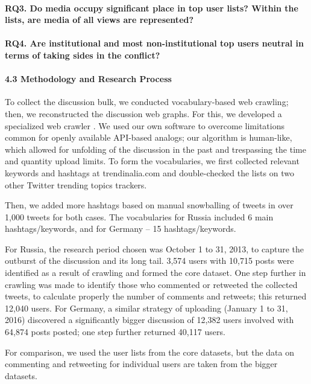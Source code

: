 \paragraph{RQ3. Do media occupy significant place in top user lists? Within the lists, are media of all views are represented?}

\paragraph{RQ4. Are institutional and most non-institutional top users neutral in terms of taking sides in the conflict?}

\paragraph{4.3 Methodology and Research Process} 

To collect the discussion bulk, we conducted vocabulary-based web crawling; then, we reconstructed the discussion web graphs. For this, we developed a specialized web crawler \cite{BlekanovSergeevMartynenko}. We used our own software to overcome limitations common for openly available API-based analogs; our algorithm is human-like, which allowed for unfolding of the discussion in the past and trespassing the time and quantity upload limits. To form the vocabularies, we first collected relevant keywords and hashtags at trendinalia.com and double-checked the lists on two other Twitter trending topics trackers.

Then, we added more hashtags based on manual snowballing of tweets in over 1,000 tweets for both cases. The vocabularies for Russia included 6 main hashtags/keywords, and for Germany -- 15 hashtags/keywords.

For Russia, the research period chosen was October 1 to 31, 2013, to capture the outburst of the discussion and its long tail. 3,574 users with 10,715 posts were identified as a result of crawling and formed the core dataset. One step further in crawling was made to identify those who commented or retweeted the collected tweets, to calculate properly the number of comments and retweets; this returned 12,040 users. For Germany, a similar strategy of uploading (January 1 to 31, 2016) discovered a significantly bigger discussion of 12,382 users involved with 64,874 posts posted; one step further returned 40,117 users.

For comparison, we used the user lists from the core datasets, but the data on commenting and retweeting for individual users are taken from the bigger datasets.

